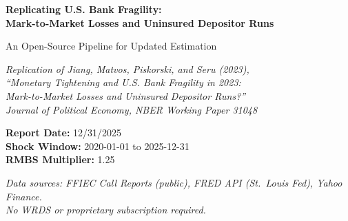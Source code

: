\documentclass[12pt, a4paper]{article}
\begin{document}
\begin{titlepage}
    \centering
    \vspace*{1.5cm}

    {\LARGE\bfseries Replicating U.S. Bank Fragility:\\[0.3em]
    Mark-to-Market Losses and Uninsured Depositor Runs \par}

    \vspace{0.5cm}
    {\large An Open-Source Pipeline for Updated Estimation \par}

    \vspace{1.5cm}
    {\normalsize\itshape
    Replication of Jiang, Matvos, Piskorski, and Seru (2023),\\
    ``Monetary Tightening and U.S. Bank Fragility in 2023:\\
    Mark-to-Market Losses and Uninsured Depositor Runs?''\\[0.3em]
    \textit{Journal of Political Economy}, NBER Working Paper 31048
    \par}

    \vspace{2cm}
    {\normalsize
    \textbf{Report Date:} 12/31/2025 \\[0.3em]
    \textbf{Shock Window:} 2020-01-01 to 2025-12-31 \\[0.3em]
    \textbf{RMBS Multiplier:} 1.25
    \par}

    \vfill
    {\small
    \textit{Data sources: FFIEC Call Reports (public), FRED API (St.\ Louis Fed),
    Yahoo Finance.\\
    No WRDS or proprietary subscription required.}
    \par}
\end{titlepage}
\end{document}
